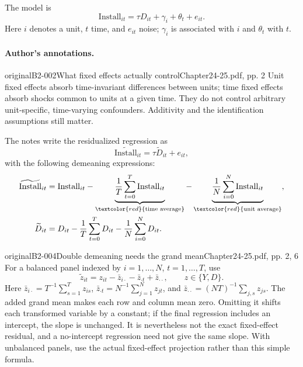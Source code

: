 The model is
\[
\mathrm{Install}_{it}=\tau D_{it}+\gamma_i+\theta_t+e_{it}.
\]
Here \(i\) denotes a unit, \(t\) time, and \(e_{it}\) noise; \(\gamma_i\) is associated with \(i\) and \(\theta_t\) with \(t\). 

\paragraph{Author's annotations.}
\begin{reviewnote}{original}{B2-002}{What fixed effects actually control}{Chapter24-25.pdf, pp. 2}
Unit fixed effects absorb time-invariant differences between units; time fixed effects absorb shocks common to units at a given time. They do not control arbitrary unit-specific, time-varying confounders. Additivity and the identification assumptions still matter.
\par{}
\end{reviewnote}

The notes write the residualized regression as
\[
\widetilde{\mathrm{Install}}_{it}=\tau\widetilde D_{it}+e_{it},
\]
with the following demeaning expressions:
\begin{align*}
\widetilde{\mathrm{Install}}_{it}
 &=\mathrm{Install}_{it}
 -\underbrace{\frac1T\sum_{t=0}^{T}\mathrm{Install}_{it}}_{\textcolor{red}{\text{time average}}}
 -\underbrace{\frac1N\sum_{i=0}^{N}\mathrm{Install}_{it}}_{\textcolor{red}{\text{unit average}}},\\
\widetilde D_{it}
 &=D_{it}-\frac1T\sum_{t=0}^{T}D_{it}-\frac1N\sum_{i=0}^{N}D_{it}.
\end{align*}
\begin{reviewnote}{original}{B2-004}{Double demeaning needs the grand mean}{Chapter24-25.pdf, pp. 2, 6}
For a balanced panel indexed by \(i=1,\ldots,N\), \(t=1,\ldots,T\), use
\[
\widetilde z_{it}=z_{it}-\bar z_{i\cdot}-\bar z_{\cdot t}+\bar z_{\cdot\cdot},\qquad z\in\{Y,D\}.
\]
Here \(\bar z_{i\cdot}=T^{-1}\sum_{s=1}^Tz_{is}\), \(\bar z_{\cdot t}=N^{-1}\sum_{j=1}^Nz_{jt}\), and \(\bar z_{\cdot\cdot}=(NT)^{-1}\sum_{j,s}z_{js}\). The added grand mean makes each row and column mean zero. Omitting it shifts each transformed variable by a constant; if the final regression includes an intercept, the slope is unchanged. It is nevertheless not the exact fixed-effect residual, and a no-intercept regression need not give the same slope. With unbalanced panels, use the actual fixed-effect projection rather than this simple formula.
\par{}
\end{reviewnote}


